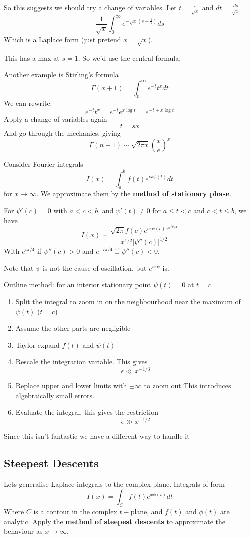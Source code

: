 \documentclass{X:/Documents/Coding/Latex/myassignment}
\begin{document}
So this suggests we should try a change of variables. Let $t=\frac{s}{\sqrt{x}}$ and $dt= \frac{ds}{\sqrt{x}}$
\[\frac{1}{\sqrt{x}} \int_0^\infty e^{-\sqrt{x} (s + \frac1s)} ds\]
Which is a Laplace form (just pretend $x = \sqrt{x}$).

This has a max at $s=1$. So we'd use the central formula.


Another example is Stirling's formula
\[\Gamma(x+1) = \int_0^\infty e^{-t} t^x dt\]
We can rewrite:
\[e^{-t} t^x = e^{-t}e^{x\log t} = e^{-t+x\log t}\]
Apply a change of variables again
\[t = sx\]
And go through the mechanics, giving
\[\Gamma(n+1) \sim \sqrt{2\pi x} \left(\frac{x}{e}\right)^x\]



Consider Fourier integrals
\[I(x) = \int_a^b f(t) e^{ix\psi (t)} dt\]
for $x\to\infty$. We approximate them by the \textbf{method of stationary phase}. 

For $\psi'(c)=0$ with $a<c<b$, and $\psi'(t) \neq 0$ for $a\leq t < c$ and $c < t\leq b$, we have
\[I(x) \sim \frac{\sqrt{2\pi} f(c) e^{ix\psi(c) e^{\pm i \pi/4}}}{x^{1/2} |\psi''(c)|^{1/2}}\]
With $e^{i\pi/4}$ if $\psi''(c) > 0$ and $e^{-i\pi/4}$ if $\psi''(c) < 0$.


Note that $\psi$ is not the cause of oscillation, but $e^{ix \psi}$ is.

Outline method: for an interior stationary point $\psi(t) = 0$ at $t=c$
\begin{enumerate}
    \item Split the integral to zoom in on the neighbourhood near the maximum of $\psi(t)$ ($t=c$)
    \item Assume the other parts are negligible
    \item Taylor expand $f(t)$ and $\psi(t)$
    \item Rescale the integration variable. This gives
    \[\epsilon \ll x^{-1/3}\]
    \item Replace upper and lower limits with $\pm\infty$ to zoom out
    This introduces algebraically small errors.
    \item Evaluate the integral, this gives the restriction
    \[\epsilon \gg x^{-1/2}\]
\end{enumerate}
Since this isn't fantastic we have a different way to handle it



\subsection{Steepest Descents}
Lets generalise Laplace integrals to the complex plane. Integrals of form
\[I(x) = \int_C f(t) e^{x\phi(t)} dt\]
Where $C$ is a contour in the complex $t-$plane, and $f(t)$ and $\phi(t)$ are analytic.
Apply the \textbf{method of steepest descents} to approximate the behaviour as $x\to\infty$.
\end{document}
